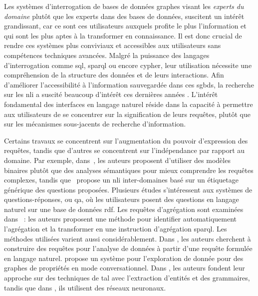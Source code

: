 Les systèmes d'interrogation de bases de données graphes visant les \emph{experts du domaine} plutôt que les experts dans des bases de données, suscitent un intérêt grandissant, car ce sont ces utilisateurs auxquels profite le plus l'information et qui sont les plus aptes à la transformer en connaissance.
Il est donc crucial de rendre ces systèmes plus conviviaux et accessibles aux utilisateurs sans compétences techniques avancées.
Malgré la puissance des langages d'interrogation comme \acrshort{sql}, \acrshort{sparql} ou encore \gls{cypher}, leur utilisation nécessite une compréhension de la structure des données et de leurs interactions.
Afin d'améliorer l'accessibilité à l'information sauvegardée dans ces \glspl{sgbd}, la recherche sur les \gls{nli} a suscité beaucoup d'intérêt ces dernières années \cite{zhengQuestionAnsweringKnowledge2018,wangCrossdomainNaturalLanguage2019,xuMirrorNaturalLanguage2023,vargas-solarTranslatingDataScience2023,vargas-solarConversationalDataExploration2023}.
L'intérêt fondamental des interfaces en langage naturel réside dans la capacité à permettre aux utilisateurs de se concentrer sur la signification de leurs requêtes, plutôt que sur les mécanismes sous-jacents de recherche d'information.

Certains travaux se concentrent sur l'augmentation du pouvoir d'expression des requêtes, tandis que d'autres se concentrent sur l'indépendance par rapport au domaine.
Par exemple, dans~\cite{zhengQuestionAnsweringKnowledge2018}, les auteurs proposent d'utiliser des modèles binaires plutôt que des analyses sémantiques pour mieux comprendre les requêtes complexes, tandis que~\cite{wangCrossdomainNaturalLanguage2019} propose un \gls{nli} inter-domaines basé sur un étiquetage générique des questions proposées.
Plusieurs études \cite{zouNaturalLanguageQuestion2014,faderOpenQuestionAnswering2014,amsterdamerNaturalLanguageInterface2015} s'intéressent aux systèmes de questions-réponses, ou \gls{qa}, où les utilisateurs posent des questions en langage naturel sur une base de données \acrshort{rdf}.
Les requêtes d'agrégation sont examinées dans~\cite{huNaturalLanguageAggregate2018} : les auteurs proposent une méthode pour identifier automatiquement l'agrégation et la transformer en une instruction d'agrégation \acrshort{sparql}.
Les méthodes utilisées varient aussi considérablement.
Dans \cite{vargas-solarTranslatingDataScience2023}, les auteurs cherchent à construire des requêtes pour l'analyse de données à partir d'une requête formulée en langage naturel.
\cite{vargas-solarConversationalDataExploration2023} propose un système pour l'exploration de donnée pour des graphes de propriétés en mode conversationnel.
Dans \cite{zafarFormalQueryGeneration2018,zhengQuestionAnsweringKnowledge2018,steinmetzNaturalLanguageQuestions2019}, les auteurs fondent leur approche sur des techniques de \gls{tal} avec l'extraction d'entités et des grammaires, tandis que dans \cite{utamaEndtoendNeuralNatural2018,wangCrossdomainNaturalLanguage2019}, ils utilisent des réseaux neuronaux.

